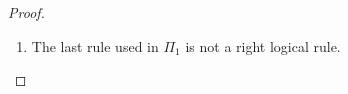 \begin{proof}
\begin{enumerate}
\begin{itemize}
    \item $G$:
      \begin{center}
        \scriptsize
        $\Pi_1:$
        \begin{math}
          $$\mprset{flushleft}
          \inferrule* [right={\tiny GR}] {
            {
              \begin{array}{c}
                \pi_1 \\
                {\Phi  \vdash_\mathcal{L}  \Ellent{A}}
              \end{array}
            }
          }{\Phi  \vdash_\mathcal{C}   \mathsf{G} \Ellent{A} }
        \end{math}
        \qquad\qquad
        $\Pi_2:$
        \begin{math}
          $$\mprset{flushleft}
          \inferrule* [right={\tiny GL}] {
            {
              \begin{array}{c}
                \pi_2 \\
                {\Gamma  \Ellesym{,}  \Ellent{A}  \Ellesym{,}  \Delta  \vdash_\mathcal{L}  \Ellent{B}}
              \end{array}
            }
          }{\Gamma  \Ellesym{,}   \mathsf{G} \Ellent{A}   \Ellesym{,}  \Delta  \vdash_\mathcal{L}  \Ellent{B}}
        \end{math}
      \end{center}
      By assumption, $c(\Pi_1),c(\Pi_2)\leq | \mathsf{G} \Ellent{A} | = |A|+1$. The proof $\Pi$ is
      constructed as follows, and $c(\Pi)\leq max\{\pi_1,\pi_2,|A|+1\}\leq | \mathsf{G} \Ellent{A} |$.
      \begin{center}
        \scriptsize
        \begin{math}
          $$\mprset{flushleft}
          \inferrule* [right={\tiny GL}] {
            {
              \begin{array}{cc}
                \pi_1 & \pi_2 \\
                {\Phi  \vdash_\mathcal{L}  \Ellent{A}} & {\Gamma  \Ellesym{,}  \Ellent{A}  \Ellesym{,}  \Delta  \vdash_\mathcal{L}  \Ellent{B}}
              \end{array}
            }
          }{\Gamma  \Ellesym{,}  \Phi  \Ellesym{,}  \Delta  \vdash_\mathcal{L}  \Ellent{B}}
        \end{math}
      \end{center}
    \end{itemize}

  \item The last rule used in $\Pi_1$ is not a right logical rule.
  \end{enumerate}
\end{proof}

